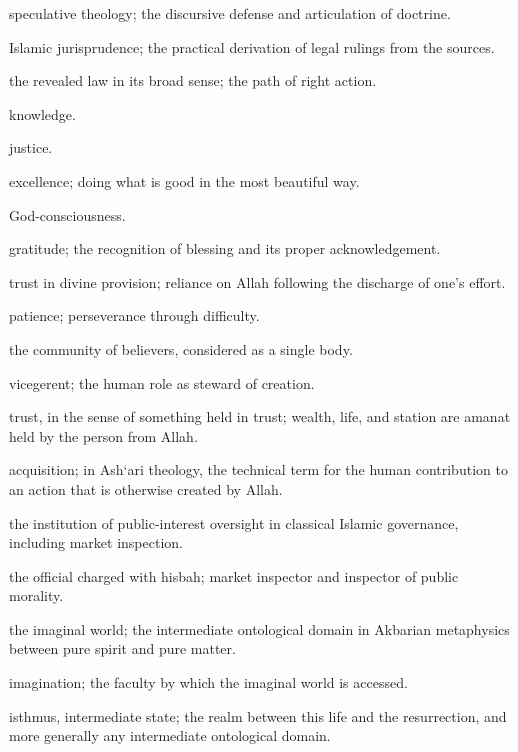 \begin{notationbox}
\begin{description}[leftmargin=4cm,style=nextline]
    \item[\textbf{kalam}] speculative theology; the discursive
        defense and articulation of doctrine.
    \item[\textbf{fiqh}] Islamic jurisprudence; the practical
        derivation of legal rulings from the sources.
    \item[\textbf{shari`ah}] the revealed law in its broad sense; the
        path of right action.
    \item[\textbf{`ilm}] knowledge.
    \item[\textbf{`adl}] justice.
    \item[\textbf{ihsan}] excellence; doing what is good in the most
        beautiful way.
    \item[\textbf{taqwa}] God-consciousness.
    \item[\textbf{shukr}] gratitude; the recognition of blessing and
        its proper acknowledgement.
    \item[\textbf{tawakkul}] trust in divine provision; reliance on
        Allah following the discharge of one's effort.
    \item[\textbf{sabr}] patience; perseverance through difficulty.
    \item[\textbf{ummah}] the community of believers, considered as a
        single body.
    \item[\textbf{khalifah}] vicegerent; the human role as steward of
        creation.
    \item[\textbf{amanah}] trust, in the sense of something held in
        trust; wealth, life, and station are amanat held by the
        person from Allah.
    \item[\textbf{kasb}] acquisition; in Ash`ari theology, the
        technical term for the human contribution to an action that
        is otherwise created by Allah.
    \item[\textbf{hisbah}] the institution of public-interest
        oversight in classical Islamic governance, including market
        inspection.
    \item[\textbf{muhtasib}] the official charged with hisbah;
        market inspector and inspector of public morality.
    \item[\textbf{`alam al-mithal}] the imaginal world; the
        intermediate ontological domain in Akbarian metaphysics
        between pure spirit and pure matter.
    \item[\textbf{khayal}] imagination; the faculty by which the
        imaginal world is accessed.
    \item[\textbf{barzakh}] isthmus, intermediate state; the realm
        between this life and the resurrection, and more generally
        any intermediate ontological domain.
\end{description}
\end{notationbox}

